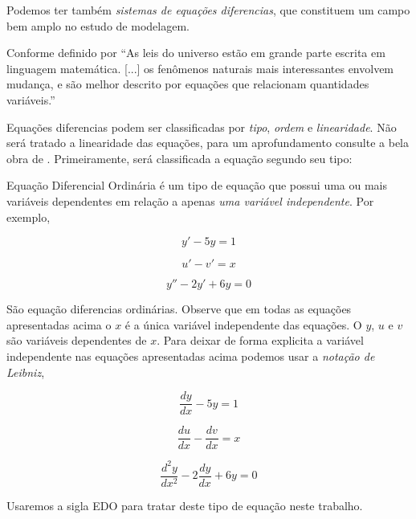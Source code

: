 Podemos ter também  \emph{sistemas de equações diferencias}, que constituem um campo bem
amplo no estudo de modelagem.

Conforme definido por  ``As leis do universo estão em grande parte escrita em
linguagem matemática. [...] os fenômenos naturais mais interessantes envolvem 
mudança, e são melhor descrito por equações que relacionam quantidades variáveis.''


Equações diferencias podem ser classificadas por \emph{tipo}, \emph{ordem} e \emph{linearidade}.
Não será tratado a linearidade das equações, para um aprofundamento consulte a bela obra de \cite{zill}.
Primeiramente, será classificada a equação segundo seu tipo:

Equação Diferencial Ordinária é um tipo de equação que 
possui uma ou mais variáveis dependentes em relação a apenas 
\emph{uma variável independente}. Por exemplo,

\begin{equation*}
y' - 5y = 1
\end{equation*}

\begin{equation*}
u' - v' = x
\end{equation*}

\begin{equation*}
y'' -2y' + 6y = 0
\end{equation*}

São equação diferencias ordinárias. Observe que em todas as equações
apresentadas acima o $x$ é a única variável independente das equações.
O $y$, $u$ e $v$ são variáveis dependentes de $x$.
Para deixar de forma explicita a variável independente nas equações 
apresentadas acima podemos usar a \emph{notação de Leibniz},

\begin{equation*}
\frac{dy}{dx} - 5y = 1
\end{equation*}


\begin{equation*}
\frac{du}{dx} - \frac{dv}{dx} = x
\end{equation*}


\begin{equation*}
\frac{d^{2}y}{dx^{2}} -2\frac{dy}{dx} + 6y = 0
\end{equation*}

Usaremos a sigla EDO para tratar deste tipo de equação neste trabalho.

